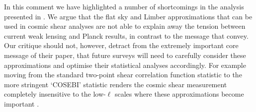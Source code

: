 In this comment we have highlighted a number of shortcomings in the analysis presented in \cite{kitching/etal:2016}.  We argue that the flat sky and Limber approximations that can be used in cosmic shear analyses are not able to explain away the tension between current weak lensing and Planck results, in contrast to the message that \cite{kitching/etal:2016} convey.  Our critique should not, however, detract from the extremely important core message of their paper, that future surveys will need to carefully consider these approximations and optimise their statistical analyses accordingly.  For example moving from the standard two-point shear correlation function statistic to the more stringent `COSEBI' statistic renders the cosmic shear measurement completely insensitive to the low-$\ell$ scales where these approximations become important \citep{schneider/etal:2010}.  
